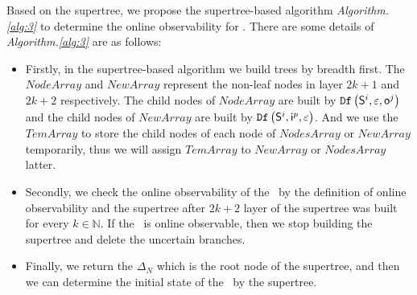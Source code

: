 Based on the supertree, we propose the supertree-based algorithm {\em Algorithm.\ref{alg:3}} to determine the online observability for \BCNs. There are some details of {\em Algorithm.\ref{alg:3}} are as follows:
\begin{itemize}
\item Firstly, in the supertree-based algorithm we build trees by breadth first. The $NodeArray$ and $NewArray$ represent the non-leaf nodes in layer $2k+1$ and $2k+2$ respectively. The child nodes of $NodeArray$ are built by ${\tt Df}\left(\mathsf{S}^i,\varepsilon, \mathsf{o}^j\right)$ and the child nodes of $NewArray$ are built by ${\tt Df}\left(\mathsf{S}^i,\mathsf{i}^p,\varepsilon\right)$. And we use the $TemArray$ to store the child nodes of each node of $NodesArray$ or $NewArray$ temporarily, thus we will assign $TemArray$ to $NewArray$ or $NodesArray$ latter.
\item Secondly, we check the online observability of the \BCN\ by the definition of online observability and the supertree after $2k+2$ layer of the supertree was built for every $k\in  \mathbb{N}$. If the \BCN\ is online observable, then we stop building the supertree and delete the uncertain branches. 
\item Finally, we return the $\Delta_N$ which is the root node of the supertree, and then we can determine the initial state of the \BCN\ by the supertree.
 \end{itemize}
